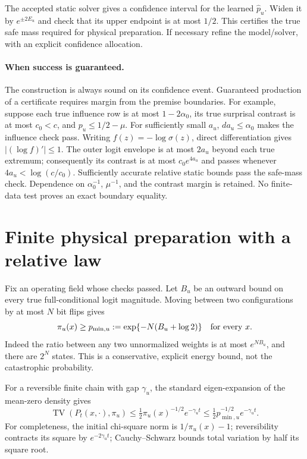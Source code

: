 \documentclass[11pt]{article}
\newcommand{\TV}{\operatorname{TV}}
\newcommand{\sig}{\sigma}
\begin{document}
The accepted static solver gives a confidence interval for the learned $\widehat p_u$. Widen it by $e^{\pm2E_u}$ and check that its upper endpoint is at most $1/2$. This certifies the true safe mass required for physical preparation. If necessary refine the model/solver, with an explicit confidence allocation.

\paragraph{When success is guaranteed.}
The construction is always sound on its confidence event. Guaranteed production of a certificate requires margin from the premise boundaries. For example, suppose each true influence row is at most $1-2\alpha_0$, its true surprisal contrast is at most $c_0<c$, and $p_u\le1/2-\mu$. For sufficiently small $a_u$, $d a_u\le\alpha_0$ makes the influence check pass. Writing $f(z)=-\log\sig(z)$, direct differentiation gives $|(\log f)'|\le1$. The outer logit envelope is at most $2a_u$ beyond each true extremum; consequently its contrast is at most $c_0e^{4a_u}$ and passes whenever $4a_u<\log(c/c_0)$. Sufficiently accurate relative static bounds pass the safe-mass check. Dependence on $\alpha_0^{-1}$, $\mu^{-1}$, and the contrast margin is retained. No finite-data test proves an exact boundary equality.

\section{Finite physical preparation with a relative law}
\label{sec:prep}
Fix an operating field whose checks passed. Let $B_u$ be an outward bound on every true full-conditional logit magnitude. Moving between two configurations by at most $N$ bit flips gives
\begin{equation}
 \pi_u(x)\ge p_{\min,u}:=\exp\{-N(B_u+\log2)\}\quad\hbox{for every }x.
 \label{eq:pimin}
\end{equation}
Indeed the ratio between any two unnormalized weights is at most $e^{NB_u}$, and there are $2^N$ states. This is a conservative, explicit energy bound, not the catastrophic probability.

For a reversible finite chain with gap $\gamma_u$, the standard eigen-expansion of the mean-zero density gives
\[
 \TV(P_t(x,\cdot),\pi_u)\le\tfrac12\pi_u(x)^{-1/2}e^{-\gamma_ut}
 \le\tfrac12p_{\min,u}^{-1/2}e^{-\gamma_ut}.
\]
For completeness, the initial chi-square norm is $1/\pi_u(x)-1$; reversibility contracts its square by $e^{-2\gamma_ut}$; Cauchy--Schwarz bounds total variation by half its square root.
\end{document}
